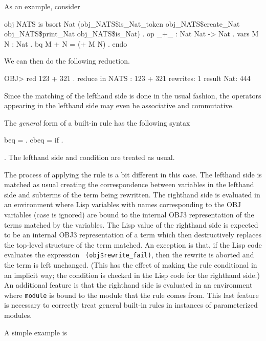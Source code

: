 As an example, consider

\bobj
obj NATS is
  bsort Nat (obj_NATS\$is_Nat_token obj_NATS\$create_Nat
               obj_NATS\$print_Nat obj_NATS\$is_Nat) .
  op _+_ : Nat Nat -> Nat .
  vars M N : Nat .
  bq M + N = (+ M N) .
endo
\eobj

\noindent We can then do the following reduction.

\bobj
OBJ> red 123 + 321 .
reduce in NATS : 123 + 321
rewrites: 1
result Nat: 444
\eobj

Since the matching of the lefthand side is done in the usual fashion,
the operators appearing in the lefthand side may even be associative
and commutative.

The {\em general} form of a built-in rule has the following syntax

\bobj
    beq  =  . \alt
    cbeq  =  if  .
\eobj

.  The lefthand side and condition are treated as usual.

The process of applying the rule is a bit different in this case.  The
lefthand side is matched as usual creating the correspondence between
variables in the lefthand side and subterms of the term being
rewritten.  The righthand side is evaluated in an environment where
Lisp variables with names corresponding to the OBJ variables (case is
ignored) are bound to the internal OBJ3 representation of the terms
matched by the variables.  The Lisp value of the righthand side is expected
to be an internal OBJ3 representation of a term which then
destructively replaces the top-level structure of the term matched.
An exception is that, if the Lisp code evaluates the expression {\tt
(obj\$rewrite\_fail)}, then the rewrite is aborted and the term is
left unchanged.  (This has the effect of making the rule conditional
in an implicit way; the condition is checked in the Lisp code for the
righthand side.)  An additional feature is that the righthand side is
evaluated in an environment where {\tt module} is bound to the module
that the rule comes from.  This last feature is necessary to correctly
treat general built-in rules in instances of parameterized modules.


A simple example is

